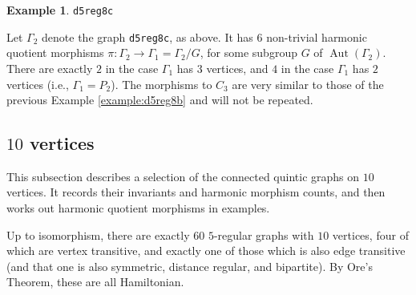 \documentclass[12pt,letterpaper]{article}
\theoremstyle{definition}
\newtheorem{example}[theorem]{Example}
\DeclareMathOperator{\Aut}{Aut}
\begin{document}
\begin{example}%
\label{example:d5reg8c}
  {\tt d5reg8c}\newline
{\rm  
  Let $\Gamma_2$ denote the graph {\tt d5reg8c}, as above.
It has $6$  non-trivial harmonic quotient morphisms
$\pi: \Gamma_2\to \Gamma_1=\Gamma_2/G$,
for some subgroup $G$ of $\Aut(\Gamma_2)$.
There are exactly $2$ in the case $\Gamma_1$ has $3$ vertices,
and $4$ in the case $\Gamma_1$ has $2$ vertices
(i.e., $\Gamma_1=P_2$).
The morphisms to $C_3$ are very similar to those of the
previous Example \ref{example:d5reg8b} and will not be repeated.
  
}
\end{example}




\subsection{\texorpdfstring{$10$}{10} vertices}

This subsection describes a selection of the connected quintic graphs on $10$ vertices.
It records their invariants and harmonic morphism counts, and then
works out harmonic quotient morphisms in examples.


Up to isomorphism, there are exactly $60$ $5$-regular graphs with $10$ vertices, four of which are vertex transitive,
and exactly one
of those which is also edge transitive (and that one is also symmetric, distance regular, and bipartite). By Ore's Theorem, these are all Hamiltonian.
\end{document}
